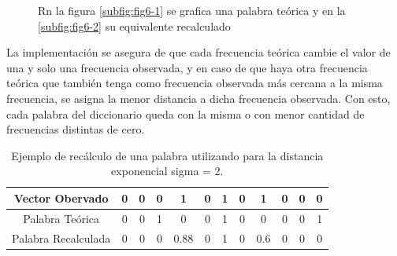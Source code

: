 \documentclass[twocolumn, draft]{emulateapj}
\begin{document}
\begin{figure}[ht]
	\centering
	\caption{Rn la figura \ref{subfig:fig6-1} se grafica una palabra teórica y en la \ref{subfig:fig6-2} su equivalente recalculado}
\end{figure}

La implementación se asegura de que cada frecuencia teórica cambie el valor de una y solo una frecuencia observada, y en caso de que haya otra frecuencia teórica que también tenga como frecuencia observada más cercana a la misma frecuencia, se asigna la menor distancia a dicha frecuencia observada. Con esto, cada palabra del diccionario queda con la misma o con menor cantidad de frecuencias distintas de cero.

\begin {table}[H]
\begin{center}
	\begin{tabular}{|c|c|c|c|c|c|c|c|c|c|c|c|}
		\hline Vector Obervado     & 0 & 0 &  0 &  1    & 0 &  1 & 0 & 1   & 0 & 0 & 0 \\ 
		\hline Palabra Teórica     & 0 & 0 &  1 &  0    & 0 &  1 & 0 & 0   & 0 & 0 & 1 \\ 
		\hline Palabra Recalculada & 0 & 0 &  0 &  0.88 & 0 &  1 & 0 & 0.6 & 0 & 0 & 0 \\ 
		\hline
	\end{tabular}
	\caption {Ejemplo de recálculo de una palabra utilizando para la distancia exponencial sigma = 2.}
\end{center}
\end{table}
\end{document}
